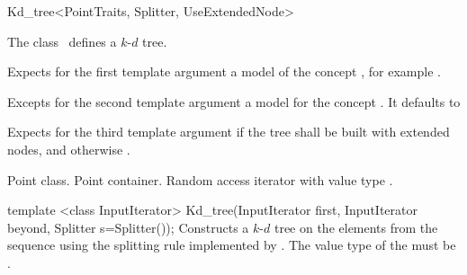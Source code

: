 

\begin{ccRefClass}{Kd_tree<PointTraits, Splitter, UseExtendedNode>}  %


\ccDefinition  
The class \ccRefName\ defines a $k$-$d$ tree.


\ccParameters

Expects for the first template argument a model of the concept
, for example .

Excepts for the second template argument a model for the concept .
It defaults  to 

Expects for the third template argument  if the 
tree shall be built with extended nodes, and otherwise .

\ccTypes

 {Point class.}
 {Point container.}
 {Random access iterator 
with value type .}


\ccCreation
{}

\ccConstructor
{template <class InputIterator> Kd_tree(InputIterator first, InputIterator beyond, Splitter s=Splitter());}
{
Constructs a $k$-$d$ tree on the elements from the sequence 
 using the splitting rule implemented by . 
The value type of the  must be .
}

\ccOperations


\end{ccRefClass}
